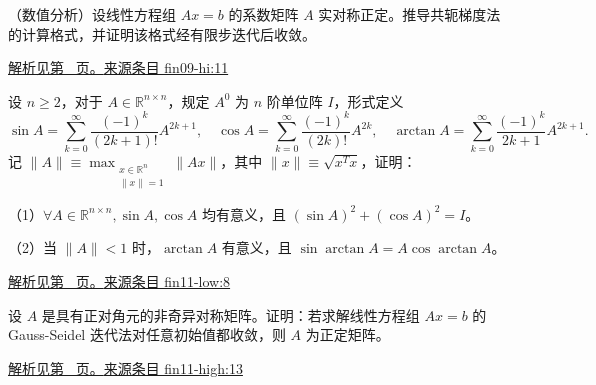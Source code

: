\documentclass[12pt,fontset=fandol]{ctexart}
\begin{document}
\begin{example}\label{ex:fin09-hi:11}

（数值分析）设线性方程组 $Ax=b$ 的系数矩阵 $A$ 实对称正定。推导共轭梯度法的计算格式，并证明该格式经有限步迭代后收敛。

\par\hyperref[ans:fin09-hi:11]{解析见第~\pageref{ans:fin09-hi:11} 页。}\quad\href{https://github.com/lzxcr/cmc-mathematics/blob/64916fa1fdbc3e444a652eca204d5669058ee321/src/problems/finals/09/13.md}{来源条目 fin09-hi:11}

\end{example}

\begin{example}\label{ex:fin11-low:8}

设 $n\geq 2$，对于 $A\in\mathbb{R}^{n\times n}$，规定 $A^{0}$ 为 $n$ 阶单位阵 $I$，形式定义
\[
\sin A=\sum_{k=0}^{\infty}\frac{(-1)^{k}}{(2k+1)!}A^{2k+1}, \quad \cos A=\sum_{k=0}^{\infty}\frac{(-1)^{k}}{(2k)!}A^{2k}, \quad \arctan A=\sum_{k=0}^{\infty}\frac{(-1)^{k}}{2k+1}A^{2k+1}.
\]
记 $\|A\| \equiv \max_{\substack{x\in\mathbb{R}^{n}\\ \|x\|=1}} \|Ax\|$，其中 $\|x\| \equiv \sqrt{x^{T}x}$，证明：

（1）$\forall A\in\mathbb{R}^{n\times n}, \sin A,\cos A$ 均有意义，且 $(\sin A)^{2}+(\cos A)^{2}=I$。

（2）当 $\|A\|<1$ 时，$\arctan A$ 有意义，且 $\sin \arctan A=A\cos \arctan A$。

\par\hyperref[ans:fin11-low:8]{解析见第~\pageref{ans:fin11-low:8} 页。}\quad\href{https://github.com/lzxcr/cmc-mathematics/blob/64916fa1fdbc3e444a652eca204d5669058ee321/src/problems/finals/11/08.md}{来源条目 fin11-low:8}

\end{example}

\begin{example}\label{ex:fin11-high:13}

设 $A$ 是具有正对角元的非奇异对称矩阵。证明：若求解线性方程组 $Ax=b$ 的 Gauss-Seidel 迭代法对任意初始值都收敛，则 $A$ 为正定矩阵。

\par\hyperref[ans:fin11-high:13]{解析见第~\pageref{ans:fin11-high:13} 页。}\quad\href{https://github.com/lzxcr/cmc-mathematics/blob/64916fa1fdbc3e444a652eca204d5669058ee321/src/problems/finals/11/15.md}{来源条目 fin11-high:13}

\end{example}
\end{document}
